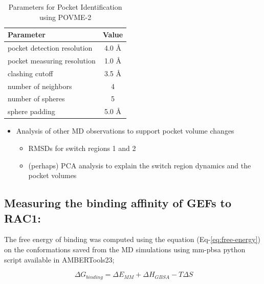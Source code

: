 \documentclass[12pt, a4paper]{achemso}
\begin{document}
    \begin{table}
  \caption{Parameters for Pocket Identification using POVME-2}
  \label{tbl:pocketID}
  \begin{tabular}{lc}
    \hline
   \textbf{Parameter}  & \textbf{Value} \\
    \hline
    pocket detection resolution	 & 4.0 \r{A}  \\
    pocket measuring resolution & 1.0 \r{A} \\
    clashing cutoff & 3.5 \r{A}  \\
    number of neighbors & 4  \\ 
    number of spheres & 5  \\
    sphere padding & 5.0 \r{A}  \\ 
    \hline
  \end{tabular}
\end{table}

\begin{itemize}
    \item Analysis of other MD observations to support pocket volume changes
        \begin{itemize}
            \item RMSDs for switch regions 1 and 2
            \item (perhaps) PCA analysis to explain the switch region dynamics and the pocket volumes
        \end{itemize}
\end{itemize}


\subsection{Measuring the binding affinity of GEFs to RAC1:} 

The free energy of binding was computed using the equation (Eq-\ref{eq:free-energy}) on the conformations saved from the MD simulations using mm-pbsa python script\cite{mmpbsa} available in AMBERTools23; 

\begin{equation} \label{eq:free-energy}
 \   {\Delta}G_{binding} = {\Delta}E_{MM} + {\Delta}H_{GBSA} - T{\Delta}S   
\end{equation}
\end{document}
